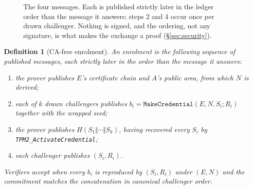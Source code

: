 \documentclass[conference,10pt]{IEEEtran}
\newtheorem{definition}{Definition}
\begin{document}
\begin{figure}[t]
\centering
{}
\caption{The four messages. Each is published strictly later in the ledger order than the message
it answers; steps 2 and 4 occur once per drawn challenger. Nothing is signed, and the ordering,
not any signature, is what makes the exchange a proof (\S\ref{sec:security}).}
\label{fig:protocol}
\end{figure}

\begin{definition}[CA-free enrolment]
\label{def:enrol}
An enrolment is the following sequence of published messages, each strictly later in the order than the
message it answers:
\begin{enumerate}
  \item the prover publishes $E$'s certificate chain and $A$'s public area, from which $N$ is derived;
  \item each of $k$ drawn challengers publishes
        $b_i = \texttt{MakeCredential}(E, N, S_i; R_i)$ together with the wrapped seed;
  \item the prover publishes $H(S_1\Vert\cdots\Vert S_k)$, having recovered every $S_i$ by
        \texttt{TPM2\_ActivateCredential};
  \item each challenger publishes $(S_i, R_i)$.
\end{enumerate}
Verifiers accept when every $b_i$ is reproduced by $(S_i, R_i)$ under $(E, N)$ and the commitment
matches the concatenation in canonical challenger order.
\end{definition}
\end{document}
